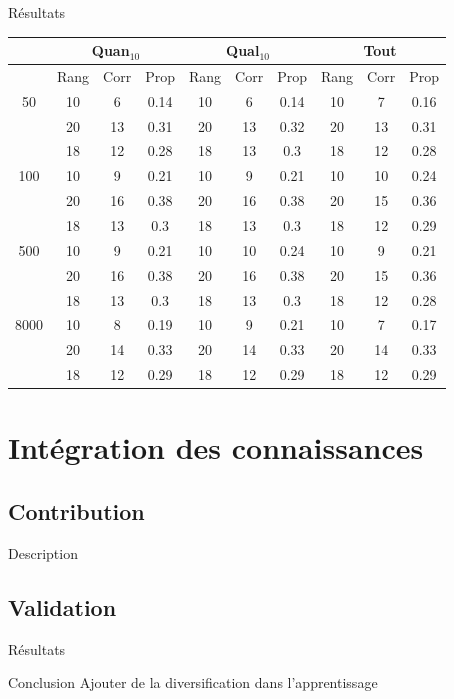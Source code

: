 \documentclass{beamer}
\begin{document}
\begin{frame}{Résultats}
\begin{tabular}{|@{}c@{}|@{}c@{}|@{}c@{}|@{}c@{}||@{}c@{}|@{}c@{}|@{}c@{}||@{}c@{}|@{}c@{}|@{}c@{}|}

\hline
 & \multicolumn{3}{c|}{Quan$_{10}$} & \multicolumn{3}{c|}{Qual$_{10}$} & \multicolumn{3}{c|}{Tout} \\
 \hline
 & Rang & Corr & Prop & Rang & Corr & Prop & Rang & Corr & Prop \\
 \hline
 50 & 10  & 6 & 0.14 & 10  & 6 & 0.14 & 10  & 7 & 0.16  \\
 \cline{2-10} 
    & 20 & 13 & 0.31 & 20  & 13 & 0.32 & 20  & 13 & 0.31  \\
 \cline{2-10} 
    & 18 & 12 & 0.28 & 18 & 13 & 0.3 & 18 & 12 & 0.28  \\
  \hline
   100 & 10  & 9 & 0.21 & 10  & 9 & 0.21 & 10  & 10 & 0.24  \\
 \cline{2-10} 
    & 20 & 16 & 0.38 & 20 & 16 & 0.38 & 20 & 15 & 0.36  \\
  \cline{2-10} 
    & 18 & 13 & 0.3 & 18 & 13 & 0.3 & 18 & 12 & 0.29  \\
  \hline
   500 & 10  & 9 & 0.21 & 10  & 10 & 0.24 & 10  & 9 & 0.21  \\
 \cline{2-10} 
    & 20 & 16 & 0.38 & 20 & 16 & 0.38 & 20 & 15 & 0.36  \\
  \cline{2-10} 
    & 18 & 13 & 0.3 & 18 & 13 & 0.3 & 18 & 12 & 0.28  \\
  \hline
   8000 & 10 & 8 & 0.19 & 10 & 9 & 0.21 & 10 & 7 & 0.17  \\
 \cline{2-10} 
    & 20 & 14 & 0.33 & 20 & 14 & 0.33 & 20 & 14 & 0.33  \\
  \cline{2-10} 
    & 18 & 12 & 0.29 & 18 & 12 & 0.29 & 18 & 12 & 0.29  \\
  \hline

\end{tabular}
\end{frame}
\section{Intégration des connaissances}

\subsection{Contribution}
\begin{frame}{Description}

\end{frame}

\subsection{Validation}
\begin{frame}{Résultats}

\end{frame}

\begin{frame}{Conclusion}
Ajouter de la diversification dans l'apprentissage
\end{frame}
\end{document}
